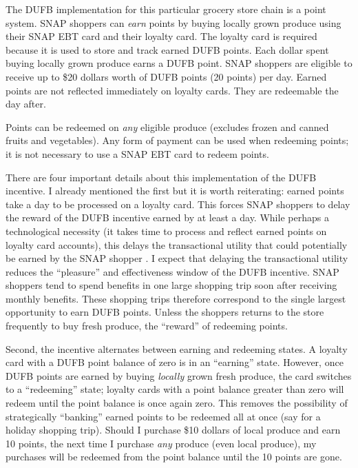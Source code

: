 \documentclass[12pt,letterpaperpaper,]{book}
\begin{document}
The DUFB implementation for this particular grocery store chain is a
point system. SNAP shoppers can \emph{earn} points by buying locally
grown produce using their SNAP EBT card and their loyalty card. The
loyalty card is required because it is used to store and track earned
DUFB points. Each dollar spent buying locally grown produce earns a DUFB
point. SNAP shoppers are eligible to receive up to \$20 dollars worth of
DUFB points (20 points) per day. Earned points are not reflected
immediately on loyalty cards. They are redeemable the day after.

Points can be redeemed on \emph{any} eligible produce (excludes frozen
and canned fruits and vegetables). Any form of payment can be used when
redeeming points; it is not necessary to use a SNAP EBT card to redeem
points.

There are four important details about this implementation of the DUFB
incentive. I already mentioned the first but it is worth reiterating:
earned points take a day to be processed on a loyalty card. This forces
SNAP shoppers to delay the reward of the DUFB incentive earned by at
least a day. While perhaps a technological necessity (it takes time to
process and reflect earned points on loyalty card accounts), this delays
the transactional utility that could potentially be earned by the SNAP
shopper \citep{thaler_mental_1985}. I expect that delaying the
transactional utility reduces the ``pleasure'' and effectiveness window
of the DUFB incentive. SNAP shoppers tend to spend benefits in one large
shopping trip soon after receiving monthly benefits. These shopping
trips therefore correspond to the single largest opportunity to earn
DUFB points. Unless the shoppers returns to the store frequently to buy
fresh produce, the ``reward'' of redeeming points.

Second, the incentive alternates between earning and redeeming states. A
loyalty card with a DUFB point balance of zero is in an ``earning''
state. However, once DUFB points are earned by buying \emph{locally}
grown fresh produce, the card switches to a ``redeeming'' state; loyalty
cards with a point balance greater than zero will redeem until the point
balance is once again zero. This removes the possibility of
strategically ``banking'' earned points to be redeemed all at once (say
for a holiday shopping trip). Should I purchase \$10 dollars of local
produce and earn 10 points, the next time I purchase \emph{any} produce
(even local produce), my purchases will be redeemed from the point
balance until the 10 points are gone.
\end{document}
